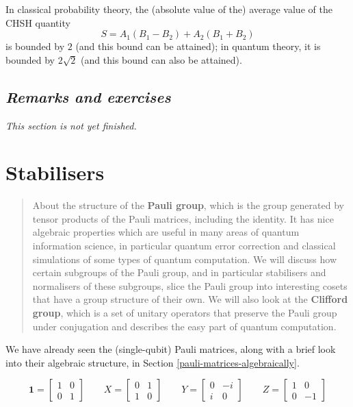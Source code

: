 \documentclass[fleqn,a4paper]{article}
\newenvironment{todo}{\color{primary}\emph{This section is not yet finished.}}{}
\let\oldsection\section
\renewcommand\section{\clearpage\oldsection}
\theoremstyle{definition}
\theoremstyle{definition}
\theoremstyle{definition}
\theoremstyle{definition}
\theoremstyle{remark}
\begin{document}
In classical probability theory, the (absolute value of the) average value of the CHSH quantity
\[
  S = A_1(B_1 - B_2) + A_2(B_1 + B_2)
\]
is bounded by \(2\) (and this bound can be attained); in quantum theory, it is bounded by \(2\sqrt{2}\) (and this bound can also be attained).

\hypertarget{remarks-and-exercises-EPR-bell}{%
\subsection{\texorpdfstring{\emph{Remarks and exercises}}{Remarks and exercises}}\label{remarks-and-exercises-EPR-bell}}

\begin{todo}

\end{todo}

\hypertarget{stabilisers}{%
\section{Stabilisers}\label{stabilisers}}

\begin{quote}
About the structure of the \textbf{Pauli group}, which is the group generated by tensor products of the Pauli matrices, including the identity.
It has nice algebraic properties which are useful in many areas of quantum information science, in particular quantum error correction and classical simulations of some types of quantum computation.
We will discuss how certain subgroups of the Pauli group, and in particular stabilisers and normalisers of these subgroups, slice the Pauli group into interesting cosets that have a group structure of their own.
We will also look at the \textbf{Clifford group}, which is a set of unitary operators that preserve the Pauli group under conjugation and describes the easy part of quantum computation.
\end{quote}

We have already seen the (single-qubit) Pauli matrices, along with a brief look into their algebraic structure, in Section \ref{pauli-matrices-algebraically}.

\[
  \mathbf{1}= \begin{bmatrix}1&0\\0&1\end{bmatrix}
  \qquad
  X = \begin{bmatrix}0&1\\1&0\end{bmatrix}
  \qquad
  Y = \begin{bmatrix}0&-i\\i&0\end{bmatrix}
  \qquad
  Z = \begin{bmatrix}1&0\\0&-1\end{bmatrix}
\]
\end{document}
